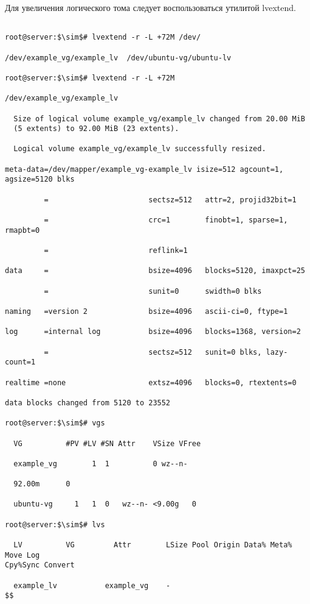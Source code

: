 \documentclass[14pt, a4paper]{article}
\begin{document}
Для увеличения логического тома следует воспользоваться утилитой \colorbox{backcolour}{lvextend}.

\newpage

\begin{lstlisting}[mathescape=true]

root@server:$\sim$# lvextend -r -L +72M /dev/

/dev/example_vg/example_lv  /dev/ubuntu-vg/ubuntu-lv

root@server:$\sim$# lvextend -r -L +72M

/dev/example_vg/example_lv

  Size of logical volume example_vg/example_lv changed from 20.00 MiB 
  (5 extents) to 92.00 MiB (23 extents).

  Logical volume example_vg/example_lv successfully resized.

meta-data=/dev/mapper/example_vg-example_lv isize=512 agcount=1, agsize=5120 blks

         =                       sectsz=512   attr=2, projid32bit=1

         =                       crc=1        finobt=1, sparse=1, rmapbt=0

         =                       reflink=1

data     =                       bsize=4096   blocks=5120, imaxpct=25

         =                       sunit=0      swidth=0 blks

naming   =version 2              bsize=4096   ascii-ci=0, ftype=1

log      =internal log           bsize=4096   blocks=1368, version=2

         =                       sectsz=512   sunit=0 blks, lazy-count=1

realtime =none                   extsz=4096   blocks=0, rtextents=0

data blocks changed from 5120 to 23552

root@server:$\sim$# vgs

  VG          #PV #LV #SN Attr    VSize VFree

  example_vg        1  1          0 wz--n-

  92.00m      0

  ubuntu-vg     1   1  0   wz--n- <9.00g   0

root@server:$\sim$# lvs

  LV          VG         Attr        LSize Pool Origin Data% Meta% Move Log
Cpy%Sync Convert

  example_lv           example_vg    -
$$
\end{lstlisting}
\vspace{0.2cm}
\end{document}
